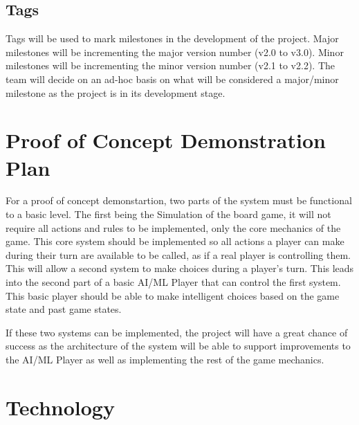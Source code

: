 \documentclass{article}
\begin{document}
\subsection{Tags}
Tags will be used to mark milestones in the development of the project. Major milestones will be incrementing the major version number (v2.0 to v3.0). Minor milestones will be incrementing the minor version number (v2.1 to v2.2). The team will decide on an ad-hoc basis on what will be considered a major/minor milestone as the project is in its development stage.

\section{Proof of Concept Demonstration Plan}

For a proof of concept demonstartion, two parts of the system must be functional to a basic level.
The first being the Simulation of the board game, it will not require all actions and rules to be implemented, only
the core mechanics of the game. This core system should be implemented so all actions a player can make during their turn
are available to be called, as if a real player is controlling them. This will allow a second system to make choices during 
a player's turn. This leads into the second part of a basic AI/ML Player that can control the first system. This basic player should
be able to make intelligent choices based on the game state and past game states. 

If these two systems can be implemented, the project will have a great chance of success as the architecture of the system will
be able to support improvements to the AI/ML Player as well as implementing the rest of the game mechanics.

\section{Technology}
\end{document}
